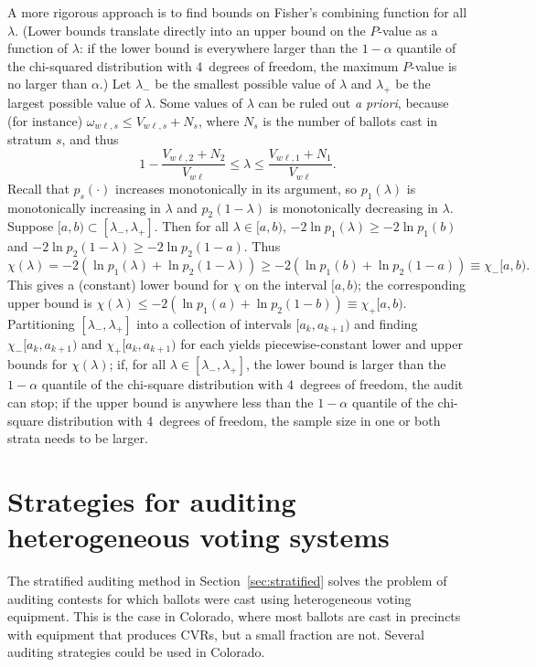 \documentclass[runningheads]{llncs}
\newcommand{\beq}{\begin{equation}}
\newcommand{\eeq}{\end{equation}}
\begin{document}
A more rigorous approach is to find bounds on Fisher's combining function for all
$\lambda$. 
(Lower bounds translate directly into an upper bound on the $P$-value as a function of
$\lambda$: if the lower bound is 
everywhere larger than the $1-\alpha$ quantile of the chi-squared distribution with 4~degrees of freedom, the maximum $P$-value is no larger than $\alpha$.)
Let $\lambda_-$ be the smallest possible value of $\lambda$ and $\lambda_+$ be the largest
possible value of $\lambda$.
Some values of $\lambda$ can be ruled out \emph{a priori}, because (for instance) $\omega_{w\ell,s} \le
V_{w\ell,s}+N_s$,
where $N_s$ is the number of ballots cast in stratum $s$, and thus
\beq
   1 - \frac{V_{w\ell,2}+N_2}{V_{w\ell}} \le \lambda \le \frac{V_{w\ell,1}+N_1}{V_{w\ell}}.
\eeq
Recall that $p_s(\cdot)$ increases monotonically in its argument, so $p_1(\lambda)$ is
monotonically increasing in $\lambda$ and $p_2(1-\lambda)$ is monotonically decreasing in $\lambda$.
Suppose $[a, b) \subset [\lambda_-, \lambda_+]$.
Then for all $\lambda \in [a, b)$, $-2\ln p_1(\lambda) \ge -2\ln p_1(b)$ and
$-2\ln p_2(1-\lambda) \ge -2\ln p_2(1-a)$.
Thus
\beq
   \chi(\lambda) = -2(\ln p_1(\lambda)+ \ln p_2(1-\lambda))
          \ge -2(\ln p_1(b) + \ln p_2(1-a)) \equiv \chi_-[a,b).
\eeq
This gives a (constant) lower bound for $\chi$ on the interval $[a, b)$; the corresponding 
upper bound is $\chi(\lambda) \le -2(\ln p_1(a) + \ln p_2(1-b)) \equiv \chi_+[a,b)$.
Partitioning $[\lambda_-, \lambda_+]$ into a collection of intervals $[a_k, a_{k+1})$
and finding $\chi_-[a_k, a_{k+1})$ and $\chi_+[a_k, a_{k+1})$ for each
yields piecewise-constant lower and upper bounds for $\chi(\lambda)$; if,
 for all $\lambda \in [\lambda_-, \lambda_+]$, the lower bound
is larger than the $1-\alpha$ quantile of the chi-square distribution with 4~degrees of freedom,
the audit can stop; if the upper bound is anywhere less than the $1-\alpha$ quantile of the chi-square distribution with 4~degrees of freedom, the sample size in one or both strata needs to be larger.



\section{Strategies for auditing heterogeneous voting systems}\label{sec:combiningMethods}
The stratified auditing method in Section~\ref{sec:stratified} solves the problem of auditing contests
for which ballots were cast using heterogeneous voting equipment.
This is the case in Colorado, where most ballots are cast in precincts with equipment that produces CVRs,
but a small fraction are not.
Several auditing strategies could be used in Colorado.
\end{document}
